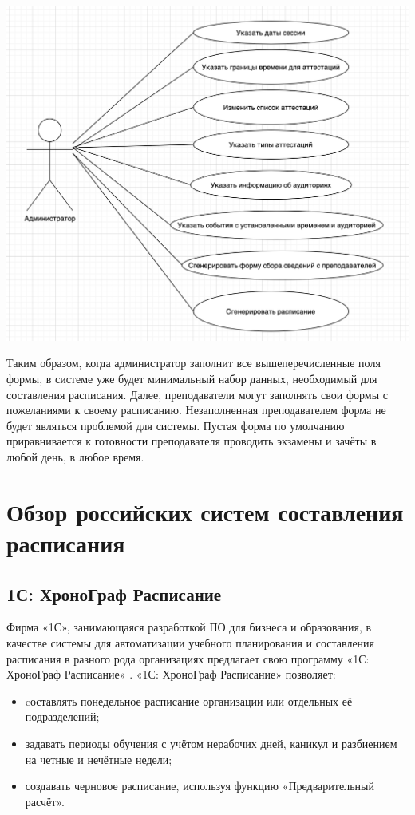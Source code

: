 \begin{minipage}{\textwidth}
	\centering
	\vspace{\mfloatsep} %
	\includegraphics[keepaspectratio=true,scale=0.6] {my_folder/images//usecase2}
	\label{fig:usecse2}  
	\vspace{\mfloatsep} %
\end{minipage}

Таким образом, когда администратор заполнит все вышеперечисленные поля формы, в системе уже будет минимальный набор данных, необходимый для составления расписания. 
Далее, преподаватели могут заполнять свои формы с пожеланиями к своему расписанию. Незаполненная преподавателем форма не будет являться проблемой для системы. Пустая форма по умолчанию приравнивается к готовности преподавателя проводить экзамены и зачёты в любой день, в любое время. 

\section{Обзор российских систем составления расписания} \label{ch1:sec2}

\subsection{1С: ХроноГраф Расписание} 
Фирма «1С», занимающаяся разработкой ПО для бизнеса и образования, в качестве системы для автоматизации учебного планирования и составления расписания в разного рода организациях предлагает свою программу «1С: ХроноГраф Расписание» \cite{1с}.
«1С: ХроноГраф Расписание» позволяет:
\begin{itemize}
	\item cоставлять понедельное расписание организации или отдельных её подразделений;
	\item задавать периоды обучения с учётом нерабочих дней, каникул и разбиением на четные и нечётные недели;
	\item создавать черновое расписание, используя функцию «Предварительный расчёт».
\end{itemize}

